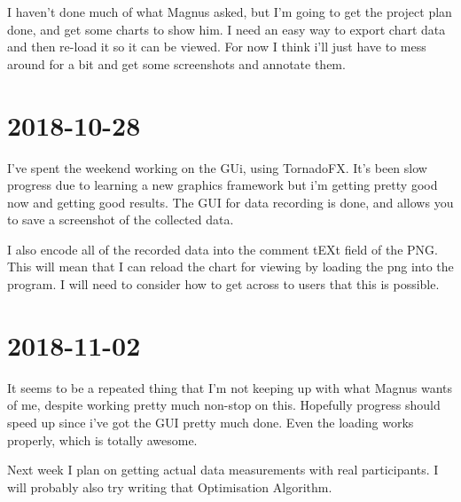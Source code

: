 \documentclass{article}
\begin{document}
	I haven't done much of what Magnus asked, but I'm going to get the project plan done, and get some charts to show him. I need an easy way to export chart data and then re-load it so it can be viewed. For now I think i'll just have to mess around for a bit and get some screenshots and annotate them.
	
	\section{2018-10-28}
	I've spent the weekend working on the GUi, using TornadoFX. It's been slow progress due to learning a new graphics framework but i'm getting pretty good now and getting good results. The GUI for data recording is done, and allows you to save a screenshot of the collected data.
	
	I also encode all of the recorded data into the comment tEXt field of the PNG. This will mean that I can reload the chart for viewing by loading the png into the program. I will need to consider how to get across to users that this is possible.
	
	\section{2018-11-02}
	It seems to be a repeated thing that I'm not keeping up with what Magnus wants of me, despite working pretty much non-stop on this. Hopefully progress should speed up since i've got the GUI pretty much done. Even the loading works properly, which is totally awesome.
	
	Next week I plan on getting actual data measurements with real participants. I will probably also try writing that Optimisation Algorithm.
		
\end{document}

